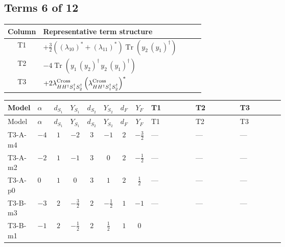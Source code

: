 \documentclass[8pt]{article}
\begin{document}
\begin{landscape}
\subsection*{Terms 6 of 12}
\begin{center}
\begin{tabular}{@{}c >{\raggedright\arraybackslash}p{0.82\linewidth}@{}}
\toprule
Column & Representative term structure \\
\midrule
T1 & \(\displaystyle +\frac{3}{2} (\left({\lambda_{10}}\right)^{*}+\left({\lambda_{11}}\right)^{*}) \operatorname{Tr}\!\left({y_2}\,\left({y_1}\right)^{\dagger}\right)\) \\
\midrule
T2 & \(\displaystyle -4 \operatorname{Tr}\!\left({y_1}\,\left({y_2}\right)^{\dagger}\,{y_2}\,\left({y_1}\right)^{\dagger}\right)\) \\
\midrule
T3 & \(\displaystyle +2 {\lambda_{H H^\dagger S_1^\dagger S_2^\dagger}^{\rm Cross}} \left({\lambda_{H H^\dagger S_1^\dagger S_2^\dagger}^{\rm Cross}}\right)^{*}\) \\
\midrule
\bottomrule
\end{tabular}
\end{center}
\smallskip
\tiny
\begin{longtable}{@{}llcccccc >{\raggedright\arraybackslash}p{0.21\linewidth} >{\raggedright\arraybackslash}p{0.21\linewidth} >{\raggedright\arraybackslash}p{0.21\linewidth}@{}}
\toprule
Model & $\alpha$ & $d_{S_1}$ & $Y_{S_1}$ & $d_{S_2}$ & $Y_{S_2}$ & $d_F$ & $Y_F$ & T1 & T2 & T3 \\
\midrule
\endfirsthead
\toprule
Model & $\alpha$ & $d_{S_1}$ & $Y_{S_1}$ & $d_{S_2}$ & $Y_{S_2}$ & $d_F$ & $Y_F$ & T1 & T2 & T3 \\
\midrule
\endhead
T3-A-m4 & $-4$ & $1$ & $-2$ & $3$ & $-1$ & $2$ & $-\frac{3}{2}$ & --- & --- & --- \\
\midrule
T3-A-m2 & $-2$ & $1$ & $-1$ & $3$ & $0$ & $2$ & $-\frac{1}{2}$ & --- & --- & --- \\
\midrule
T3-A-p0 & $0$ & $1$ & $0$ & $3$ & $1$ & $2$ & $\frac{1}{2}$ & --- & --- & --- \\
\midrule
T3-B-m3 & $-3$ & $2$ & $-\frac{3}{2}$ & $2$ & $-\frac{1}{2}$ & $1$ & $-1$ & --- & --- & --- \\
\midrule
T3-B-m1 & $-1$ & $2$ & $-\frac{1}{2}$ & $2$ & $\frac{1}{2}$ & $1$ & $0$ & \scriptsize\adjustbox{max width=\linewidth}{$\begin{gathered} +\frac{3}{2} (\left({\lambda_{10}}\right)^{*}+\left({\lambda_{11}}\right)^{*}) \operatorname{Tr}\!\left({y_2}\,\left({y_1}\right)^{\dagger}\right)\end{gathered}$} & \scriptsize\adjustbox{max width=\linewidth}{$\begin{gathered} -4 \operatorname{Tr}\!\left({y_1}\,\left({y_2}\right)^{\dagger}\,{y_2}\,\left({y_1}\right)^{\dagger}\right)\end{gathered}$} & \scriptsize\adjustbox{max width=\linewidth}{$\begin{gathered} +2 {\lambda_{H H^\dagger S_1^\dagger S_2^\dagger}^{\rm Cross}} \left({\lambda_{H H^\dagger S_1^\dagger S_2^\dagger}^{\rm Cross}}\right)^{*}\end{gathered}$} \\

\end{longtable}
\end{landscape}
\end{document}
